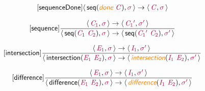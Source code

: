\documentclass[10pt,leqno,fleqn]{article}
\newcommand{\artVariable}[1]{\mbox{\color{purple}\em #1\/}}
\newcommand{\artConstructor}[1]{\mbox{\sf #1}}
\newcommand{\artSpecial}[1]{\mbox{\color{orange}\sf\em #1}}
\begin{document}
\begin{equation}
\tag*{[\artConstructor{\sf sequenceDone}]}
\begin{split}\langle\, \artConstructor{\sf seq}(\artSpecial{done}\ \artVariable{C}), \artVariable{$\sigma$}\,\rangle \rightarrow \langle\, \artVariable{C}, \artVariable{$\sigma$}\,\rangle 
\end{split}
\end{equation}

\begin{equation}
\tag*{[\artConstructor{\sf sequence}]}
\begin{split}\frac{\langle\, \artVariable{C$_{1}$}, \artVariable{$\sigma$}\,\rangle \rightarrow \langle\, \artVariable{C$_{1}$\/$^\prime$}, \artVariable{$\sigma$\/$^\prime$}\,\rangle }{\langle\, \artConstructor{\sf seq}(\artVariable{C$_{1}$}\ \artVariable{C$_{2}$}), \artVariable{$\sigma$}\,\rangle \rightarrow \langle\, \artConstructor{\sf seq}(\artVariable{C$_{1}$\/$^\prime$}\ \artVariable{C$_{2}$}), \artVariable{$\sigma$\/$^\prime$}\,\rangle }
\end{split}
\end{equation}

\begin{equation}
\tag*{[\artConstructor{\sf intersection}]}
\begin{split}\frac{\langle\, \artVariable{E$_{1}$}, \artVariable{$\sigma$}\,\rangle \rightarrow \langle\, \artVariable{I$_{1}$}, \artVariable{$\sigma$\/$^\prime$}\,\rangle }{\langle\, \artConstructor{\sf intersection}(\artVariable{E$_{1}$}\ \artVariable{E$_{2}$}), \artVariable{$\sigma$}\,\rangle \rightarrow \langle\, \artSpecial{intersection}(\artVariable{I$_{1}$}\ \artVariable{E$_{2}$}), \artVariable{$\sigma$\/$^\prime$}\,\rangle }
\end{split}
\end{equation}

\begin{equation}
\tag*{[\artConstructor{\sf difference}]}
\begin{split}\frac{\langle\, \artVariable{E$_{1}$}, \artVariable{$\sigma$}\,\rangle \rightarrow \langle\, \artVariable{I$_{1}$}, \artVariable{$\sigma$\/$^\prime$}\,\rangle }{\langle\, \artConstructor{\sf difference}(\artVariable{E$_{1}$}\ \artVariable{E$_{2}$}), \artVariable{$\sigma$}\,\rangle \rightarrow \langle\, \artSpecial{difference}(\artVariable{I$_{1}$}\ \artVariable{E$_{2}$}), \artVariable{$\sigma$\/$^\prime$}\,\rangle }
\end{split}
\end{equation}
\end{document}
